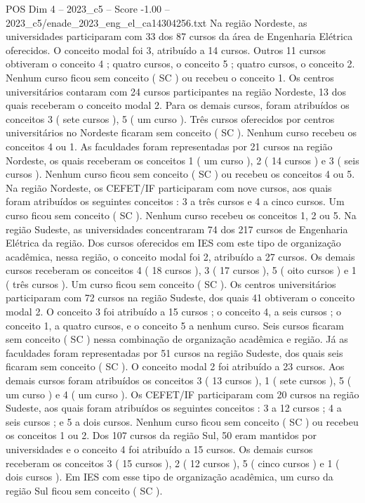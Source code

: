 \begin{textsample}{POS Dim 4 – 2023\_c5 – Score -1.00 – 2023\_c5/enade\_2023\_eng\_el\_ca14304256.txt}
Na região Nordeste, as universidades participaram com 33 dos 87 cursos da área de Engenharia Elétrica oferecidos.
O conceito modal foi 3, atribuído a 14 cursos.
Outros 11 cursos obtiveram o conceito 4 ; quatro cursos, o conceito 5 ; quatro cursos, o conceito 2.
Nenhum curso ficou sem conceito ( SC ) ou recebeu o conceito 1.
Os centros universitários contaram com 24 cursos participantes na região Nordeste, 13 dos quais receberam o conceito modal 2.
Para os demais cursos, foram atribuídos os conceitos 3 ( sete cursos ), 5 ( um curso ).
Três cursos oferecidos por centros universitários no Nordeste ficaram sem conceito ( SC ).
Nenhum curso recebeu os conceitos 4 ou 1.
As faculdades foram representadas por 21 cursos na região Nordeste, os quais receberam os conceitos 1 ( um curso ), 2 ( 14 cursos ) e 3 ( seis cursos ).
Nenhum curso ficou sem conceito ( SC ) ou recebeu os conceitos 4 ou 5.
Na região Nordeste, os CEFET/IF participaram com nove cursos, aos quais foram atribuídos os seguintes conceitos : 3 a três cursos e 4 a cinco cursos.
Um curso ficou sem conceito ( SC ).
Nenhum curso recebeu os conceitos 1, 2 ou 5.
Na região Sudeste, as universidades concentraram 74 dos 217 cursos de Engenharia Elétrica da região.
Dos cursos oferecidos em IES com este tipo de organização acadêmica, nessa região, o conceito modal foi 2, atribuído a 27 cursos.
Os demais cursos receberam os conceitos 4 ( 18 cursos ), 3 ( 17 cursos ), 5 ( oito cursos ) e 1 ( três cursos ).
Um curso ficou sem conceito ( SC ).
Os centros universitários participaram com 72 cursos na região Sudeste, dos quais 41 obtiveram o conceito modal 2.
O conceito 3 foi atribuído a 15 cursos ; o conceito 4, a seis cursos ; o conceito 1, a quatro cursos, e o conceito 5 a nenhum curso.
Seis cursos ficaram sem conceito ( SC ) nessa combinação de organização acadêmica e região.
Já as faculdades foram representadas por 51 cursos na região Sudeste, dos quais seis ficaram sem conceito ( SC ).
O conceito modal 2 foi atribuído a 23 cursos.
Aos demais cursos foram atribuídos os conceitos 3 ( 13 cursos ), 1 ( sete cursos ), 5 ( um curso ) e 4 ( um curso ).
Os CEFET/IF participaram com 20 cursos na região Sudeste, aos quais foram atribuídos os seguintes conceitos : 3 a 12 cursos ; 4 a seis cursos ; e 5 a dois cursos.
Nenhum curso ficou sem conceito ( SC ) ou recebeu os conceitos 1 ou 2.
Dos 107 cursos da região Sul, 50 eram mantidos por universidades e o conceito 4 foi atribuído a 15 cursos.
Os demais cursos receberam os conceitos 3 ( 15 cursos ), 2 ( 12 cursos ), 5 ( cinco cursos ) e 1 ( dois cursos ).
Em IES com esse tipo de organização acadêmica, um curso da região Sul ficou sem conceito ( SC ).

\end{textsample}
